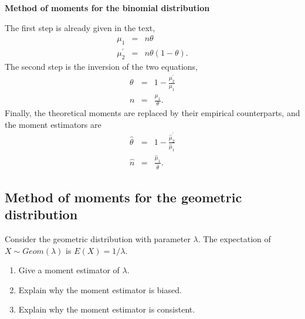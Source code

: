 \documentclass{article}
\begin{document}
\begin{solution}
\textbf{Method of moments for the binomial distribution}

The first step is already given in the text,%
\begin{eqnarray*}
\mu _{1} &=&n\theta  \\
\mu _{2}^{\prime } &=&n\theta \left( 1-\theta \right) .
\end{eqnarray*}%
The second step is the inversion of the two equations,%
\begin{eqnarray*}
\theta  &=&1-\frac{\mu _{2}^{\prime }}{\mu _{1}} \\
n &=&\frac{\mu _{1}}{\theta }.
\end{eqnarray*}%
Finally, the theoretical moments are replaced by their empirical
counterparts, and the moment estimators are%
\begin{eqnarray*}
\hat{\theta} &=&1-\frac{\hat{\mu}_{2}^{\prime }}{\hat{\mu}_{1}} \\
\hat{n} &=&\frac{\hat{\mu}_{1}}{\hat{\theta}}.
\end{eqnarray*}
\end{solution}

\subsection{Method of moments for the geometric distribution}

Consider the geometric distribution with parameter $\lambda $. The
expectation of $X\sim Geom(\lambda )$ is $E(X)=1/\lambda $.

\begin{enumerate}
\item Give a moment estimator of $\lambda .$

\item Explain why the moment estimator is biased.

\item Explain why the moment estimator is consistent.
\end{enumerate}
\end{document}
